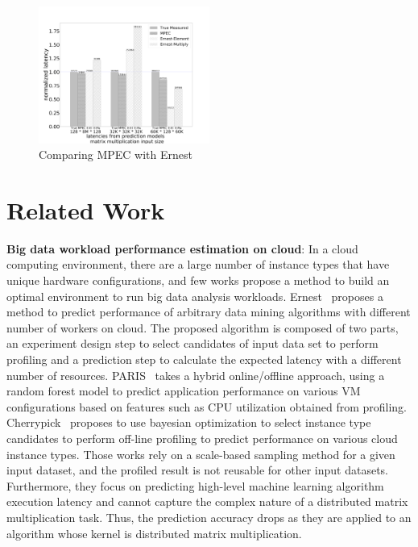 \documentclass[10pt, conference, compsocconf]{IEEEtran}
\begin{document}
\begin{figure}[t]
	\centering\includegraphics[width=0.5\textwidth]{figures/MPC-Ernest-compare.pdf}\caption{Comparing MPEC with Ernest}\label{fig:mpc-ernest}
\end{figure}

\section{Related Work}\label{sec:relatedwork}
\textbf{Big data workload performance estimation on cloud}: In a cloud computing environment, there are a large number of instance types that have unique hardware configurations, and few works propose a method to build an optimal environment to run big data analysis  workloads. Ernest~\cite{ernest} proposes a method to predict performance of arbitrary data mining algorithms with different number of workers on cloud. The proposed algorithm is composed of two parts, an experiment design step to select candidates of input data set to perform profiling and a prediction step to calculate the expected latency with a different number of resources. PARIS~\cite{paris} takes a hybrid online/offline approach, using a random forest model to predict application performance on various VM configurations based on features such as CPU utilization obtained from profiling. Cherrypick~\cite{cherrypick} proposes to use bayesian optimization to select instance type candidates to perform off-line profiling to predict performance on various cloud instance types. Those works rely on a scale-based sampling method for a given input dataset, and the profiled result is not reusable for other input datasets. Furthermore, they focus on predicting high-level machine learning algorithm execution latency and cannot capture the complex nature of a distributed matrix multiplication task. Thus, the prediction accuracy drops as they are applied to an algorithm whose kernel is distributed matrix multiplication.
\end{document}
